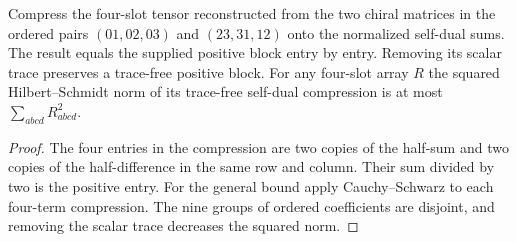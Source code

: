 \begin{lemma}
\label{lem:compression-reconstruction}
\leanok
Compress the four-slot tensor reconstructed from the two chiral matrices
in the ordered pairs $(01,02,03)$ and $(23,31,12)$ onto the normalized
self-dual sums. The result equals the supplied positive block entry by
entry. Removing its scalar trace preserves a trace-free positive block. For any
four-slot array $R$ the squared Hilbert--Schmidt norm of its trace-free
self-dual compression is at most $\sum_{abcd}R_{abcd}^2$.
\end{lemma}
\begin{proof}
\leanok
The four entries in the compression are two copies of the half-sum
and two copies of the half-difference in the same row and column.
Their sum divided by two is the positive entry. For the general bound
apply Cauchy--Schwarz to each four-term compression. The nine groups of
ordered coefficients are disjoint, and removing the scalar trace decreases
the squared norm.
\end{proof}

